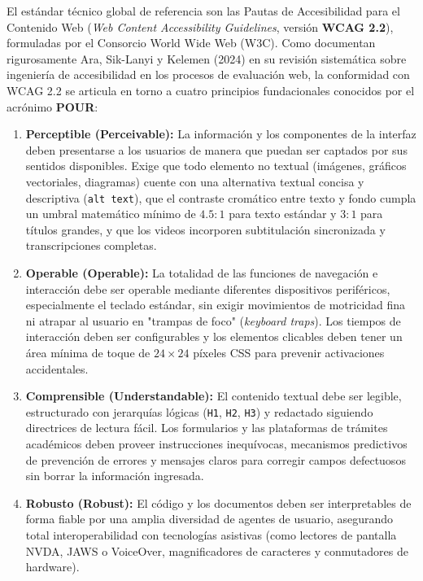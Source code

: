 El estándar técnico global de referencia son las Pautas de Accesibilidad para el Contenido Web (\textit{Web Content Accessibility Guidelines}, versión \textbf{WCAG 2.2}), formuladas por el Consorcio World Wide Web (W3C). Como documentan rigurosamente Ara, Sik-Lanyi y Kelemen (2024) en su revisión sistemática sobre ingeniería de accesibilidad en los procesos de evaluación web, la conformidad con WCAG 2.2 se articula en torno a cuatro principios fundacionales conocidos por el acrónimo \textbf{POUR}:
\begin{enumerate}
    \item \textbf{Perceptible (Perceivable):} La información y los componentes de la interfaz deben presentarse a los usuarios de manera que puedan ser captados por sus sentidos disponibles. Exige que todo elemento no textual (imágenes, gráficos vectoriales, diagramas) cuente con una alternativa textual concisa y descriptiva (\texttt{alt text}), que el contraste cromático entre texto y fondo cumpla un umbral matemático mínimo de $4.5:1$ para texto estándar y $3:1$ para títulos grandes, y que los videos incorporen subtitulación sincronizada y transcripciones completas.
    \item \textbf{Operable (Operable):} La totalidad de las funciones de navegación e interacción debe ser operable mediante diferentes dispositivos periféricos, especialmente el teclado estándar, sin exigir movimientos de motricidad fina ni atrapar al usuario en "trampas de foco" (\textit{keyboard traps}). Los tiempos de interacción deben ser configurables y los elementos clicables deben tener un área mínima de toque de $24 \times 24$ píxeles CSS para prevenir activaciones accidentales.
    \item \textbf{Comprensible (Understandable):} El contenido textual debe ser legible, estructurado con jerarquías lógicas (\texttt{H1}, \texttt{H2}, \texttt{H3}) y redactado siguiendo directrices de lectura fácil. Los formularios y las plataformas de trámites académicos deben proveer instrucciones inequívocas, mecanismos predictivos de prevención de errores y mensajes claros para corregir campos defectuosos sin borrar la información ingresada.
    \item \textbf{Robusto (Robust):} El código y los documentos deben ser interpretables de forma fiable por una amplia diversidad de agentes de usuario, asegurando total interoperabilidad con tecnologías asistivas (como lectores de pantalla NVDA, JAWS o VoiceOver, magnificadores de caracteres y conmutadores de hardware).
\end{enumerate}

